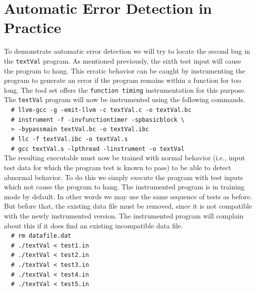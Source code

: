 


\section{Automatic Error Detection in Practice}
	
	To demonstrate automatic error detection we will try to locate the second bug in the \verb|textVal|
	program.
	As mentioned previously, the sixth test input will cause the program to hang.
	This erratic behavior can be caught by instrumenting the program to generate an error if
	the program remains within a function for too long.
	The tool set offers the \verb|function timing| instrumentation for this purpose.
	The \verb|textVal| program will now be instrumented using the following commands.\\
	\verb|  # llvm-gcc -g -emit-llvm -c textVal.c -o textVal.bc| \\
	\verb|  # instrument -f -invfunctiontimer -spbasicblock \ | \\
	\verb|  > -bypassmain textVal.bc -o textVal.ibc| \\
	\verb|  # llc -f textVal.ibc -o textVal.s| \\
	\verb|  # gcc textVal.s -lpthread -linstrument -o textVal| \\

	The resulting executable must now be trained with normal behavior
	(i.e., input test data for which the program test is known to pass)
	to be able to detect abnormal behavior.
	To do this we simply execute the program with test inputs which not cause the program to hang.
	The instrumented program is in training mode by default.
	In other words we may use the same sequence of tests as before.
	But before that, the existing data file must be removed, 
	since it is not compatible with the newly instrumented version.
	The instrumented program will complain about this if it does find an existing incompatible data file.\\
	\verb|  # rm datafile.dat|\\
	\verb|  # ./textVal < test1.in|\\
	\verb|  # ./textVal < test2.in|\\
	\verb|  # ./textVal < test3.in|\\
	\verb|  # ./textVal < test4.in|\\
	\verb|  # ./textVal < test5.in|\\
	
